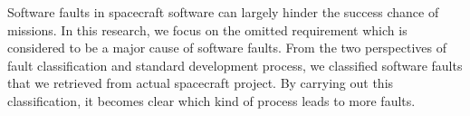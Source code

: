 Software faults in spacecraft software can largely hinder the success chance of missions.
In this research, we focus on the omitted requirement which is considered to be a major cause of software faults.
From the two perspectives of fault classification and standard development process, we classified software faults that we retrieved from actual spacecraft project.
By carrying out this classification, it becomes clear which kind of process leads to more faults.
